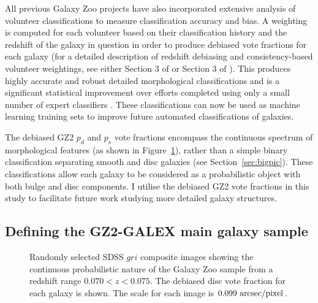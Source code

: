 All previous Galaxy Zoo projects have also incorporated extensive analysis of volunteer classifications to measure classification accuracy and bias. A weighting is computed for each volunteer based on their classification history and the redshift of the galaxy in question in order to produce debiased vote fractions for each galaxy (for a detailed description of redshift debiasing and consistency-based volunteer weightings, see either Section 3 of \citealt{Lintott09} or Section 3 of \citealt{GZ2}). This produces highly accurate and robust detailed morphological classifications and is a significant statistical improvement over efforts completed using only a small number of expert classifiers \citep{schawinski07, nair10b, ann15}. These classifications can now be used as machine learning training sets \citep{dieleman15} to improve future automated classifications of galaxies. 

The debiased GZ2 $p_d$ and $p_s$ vote fractions encompass the continuous spectrum of morphological features (as shown in Figure~\ref{fig:mosaic}), rather than a simple binary classification separating smooth and disc galaxies (see Section~\ref{sec:bigpic}). These classifications allow each galaxy to be considered as a probabilistic object with both bulge and disc components. I utilise the debiased GZ2 vote fractions in this study to facilitate future work studying more detailed galaxy structures. 

\subsection{Defining the GZ2-GALEX main galaxy sample}\label{sec:defsample}

\begin{figure}
\caption[Example SDSS images with GZ2 vote fractions]{Randomly selected SDSS $gri$ composite images showing the continuous probabilistic nature of the Galaxy Zoo sample from a redshift range $0.070 < z < 0.075$. The debiased disc vote fraction for each galaxy is shown. The scale for each image is $0.099~\rm{arcsec/pixel}$.}
\label{fig:mosaic}
\end{figure}

